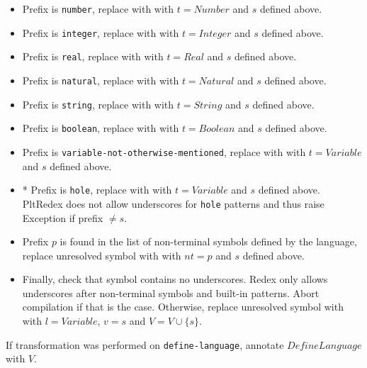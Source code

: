 \begin{itemize}
\item
Prefix is \texttt{number}, replace \UnresolvedSymbol with  \BuiltInPattern with $t=Number$ and $s$ defined above.

\item
Prefix is \texttt{integer}, replace \UnresolvedSymbol with  \BuiltInPattern with $t=Integer$ and $s$ defined above.

\item
Prefix is \texttt{real}, replace \UnresolvedSymbol with  \BuiltInPattern with $t=Real$ and $s$ defined above.

\item
Prefix is \texttt{natural}, replace \UnresolvedSymbol with  \BuiltInPattern with $t=Natural$ and $s$ defined above.

\item
Prefix is \texttt{string}, replace \UnresolvedSymbol with  \BuiltInPattern with $t=String$ and $s$ defined above.

\item
Prefix is \texttt{boolean}, replace \UnresolvedSymbol with  \BuiltInPattern with $t=Boolean$ and $s$ defined above.

\item
Prefix is \texttt{variable-not-otherwise-mentioned}, replace \UnresolvedSymbol with  \BuiltInPattern with $t=Variable$ and $s$ defined above.

\item
* Prefix is \texttt{hole}, replace \UnresolvedSymbol with  \BuiltInPattern with $t=Variable$ and $s$ defined above. PltRedex does not allow underscores for \texttt{hole} patterns and thus raise Exception if prefix $\neq s$.

\item
Prefix $p$ is found in the list of non-terminal symbols defined by the language, replace unresolved symbol with \Nt with $nt=p$ and $s$ defined above.

\item
Finally, check that symbol contains no underscores. Redex only allows underscores after non-terminal symbols and built-in patterns. Abort compilation if that is the case. Otherwise, replace unresolved symbol with \LiteralPattern with $l=Variable$, $v=s$ and $V = V \cup \{s\}$.

\end{itemize}

If transformation was performed on \texttt{define-language}, annotate $DefineLanguage$ with $V$.


